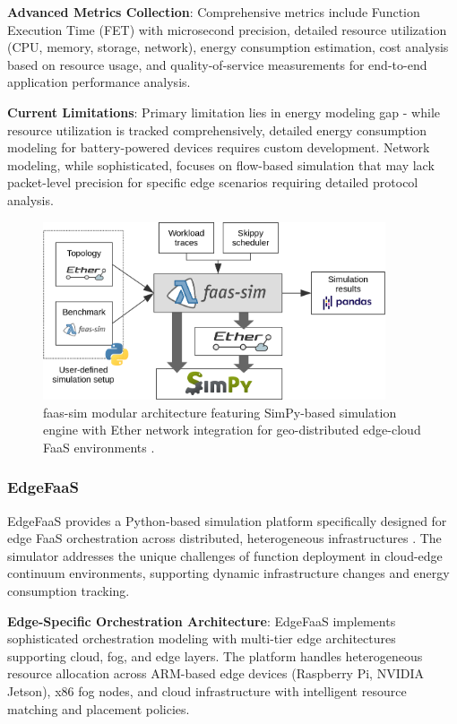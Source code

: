 \textbf{Advanced Metrics Collection}: Comprehensive metrics include Function Execution Time (FET) with microsecond precision, detailed resource utilization (CPU, memory, storage, network), energy consumption estimation, cost analysis based on resource usage, and quality-of-service measurements for end-to-end application performance analysis.

\textbf{Current Limitations}: Primary limitation lies in energy modeling gap - while resource utilization is tracked comprehensively, detailed energy consumption modeling for battery-powered devices requires custom development. Network modeling, while sophisticated, focuses on flow-based simulation that may lack packet-level precision for specific edge scenarios requiring detailed protocol analysis.

\begin{figure}[htbp]
\centering
\includegraphics[width=0.9\textwidth]{assets/faas-sim arch.png}
\caption{faas-sim modular architecture featuring SimPy-based simulation engine with Ether network integration for geo-distributed edge-cloud FaaS environments \cite{boughzala2022faassim}.}
\label{fig:faas-sim-architecture}
\end{figure}


\subsubsection{EdgeFaaS}

EdgeFaaS provides a Python-based simulation platform specifically designed for edge FaaS orchestration across distributed, heterogeneous infrastructures \cite{li2022edgefaas}. The simulator addresses the unique challenges of function deployment in cloud-edge continuum environments, supporting dynamic infrastructure changes and energy consumption tracking.

\textbf{Edge-Specific Orchestration Architecture}: EdgeFaaS implements sophisticated orchestration modeling with multi-tier edge architectures supporting cloud, fog, and edge layers. The platform handles heterogeneous resource allocation across ARM-based edge devices (Raspberry Pi, NVIDIA Jetson), x86 fog nodes, and cloud infrastructure with intelligent resource matching and placement policies.

